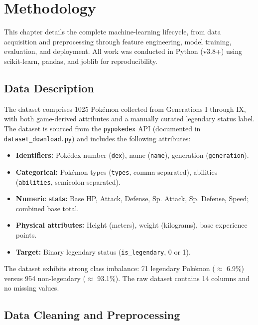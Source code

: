 \chapter{Methodology}
\label{chap:methods}

This chapter details the complete machine-learning lifecycle, from data acquisition and preprocessing through feature engineering, model training, evaluation, and deployment. All work was conducted in Python (v3.8+) using scikit-learn, pandas, and joblib for reproducibility.

\section{Data Description}
\label{sec:data_description}

The dataset comprises 1025 Pokémon collected from Generations I through IX, with both game-derived attributes and a manually curated legendary status label. The dataset is sourced from the \texttt{pypokedex} API (documented in \texttt{dataset\_download.py}) and includes the following attributes:

\begin{itemize}
  \item \textbf{Identifiers:} Pokédex number (\texttt{dex}), name (\texttt{name}), generation (\texttt{generation}).
  \item \textbf{Categorical:} Pokémon types (\texttt{types}, comma-separated), abilities (\texttt{abilities}, semicolon-separated).
  \item \textbf{Numeric stats:} Base HP, Attack, Defense, Sp. Attack, Sp. Defense, Speed; combined base total.
  \item \textbf{Physical attributes:} Height (meters), weight (kilograms), base experience points.
  \item \textbf{Target:} Binary legendary status (\texttt{is\_legendary}, 0 or 1).
\end{itemize}

The dataset exhibits strong class imbalance: 71 legendary Pokémon ($\approx$ 6.9\%) versus 954 non-legendary ($\approx$ 93.1\%). The raw dataset contains 14 columns and no missing values.

\section{Data Cleaning and Preprocessing}
\label{sec:data_cleaning}

